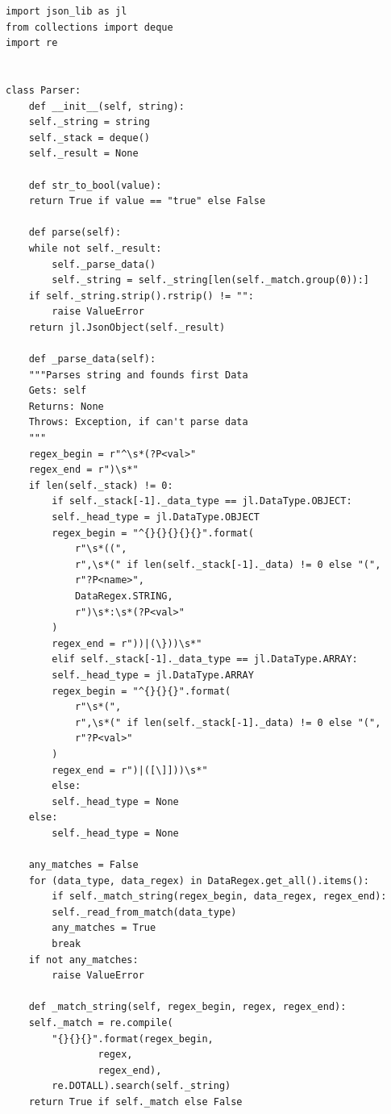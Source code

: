 \documentclass[11pt]{article}
\begin{document}
\begin{lstlisting}
import json_lib as jl
from collections import deque
import re


class Parser:
    def __init__(self, string):
	self._string = string
	self._stack = deque()
	self._result = None

    def str_to_bool(value):
	return True if value == "true" else False

    def parse(self):
	while not self._result:
	    self._parse_data()
	    self._string = self._string[len(self._match.group(0)):]
	if self._string.strip().rstrip() != "":
	    raise ValueError
	return jl.JsonObject(self._result)

    def _parse_data(self):
	"""Parses string and founds first Data
	Gets: self
	Returns: None
	Throws: Exception, if can't parse data
	"""
	regex_begin = r"^\s*(?P<val>"
	regex_end = r")\s*"
	if len(self._stack) != 0:
	    if self._stack[-1]._data_type == jl.DataType.OBJECT:
		self._head_type = jl.DataType.OBJECT
		regex_begin = "^{}{}{}{}{}".format(
		    r"\s*((",
		    r",\s*(" if len(self._stack[-1]._data) != 0 else "(",
		    r"?P<name>",
		    DataRegex.STRING,
		    r")\s*:\s*(?P<val>"
		)
		regex_end = r"))|(\}))\s*"
	    elif self._stack[-1]._data_type == jl.DataType.ARRAY:
		self._head_type = jl.DataType.ARRAY
		regex_begin = "^{}{}{}".format(
		    r"\s*(",
		    r",\s*(" if len(self._stack[-1]._data) != 0 else "(",
		    r"?P<val>"
		)
		regex_end = r")|([\]]))\s*"
	    else:
		self._head_type = None
	else:
	    self._head_type = None

	any_matches = False
	for (data_type, data_regex) in DataRegex.get_all().items():
	    if self._match_string(regex_begin, data_regex, regex_end):
		self._read_from_match(data_type)
		any_matches = True
		break
	if not any_matches:
	    raise ValueError

    def _match_string(self, regex_begin, regex, regex_end):
	self._match = re.compile(
	    "{}{}{}".format(regex_begin,
			    regex,
			    regex_end),
	    re.DOTALL).search(self._string)
	return True if self._match else False


\end{lstlisting}
\end{document}
